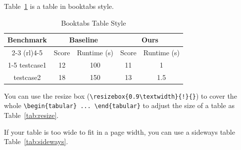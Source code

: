 Table~\ref{tab:booktabs-style} is a table in booktabs style.

\begin{table}[ht]
    \centering
    \caption{Booktabs Table Style}
    \begin{tabular}{@{}ccccc@{}}
    \toprule
    \multirow{2}{*}{Benchmark} & \multicolumn{2}{c}{Baseline} & \multicolumn{2}{c}{Ours} \\ \cmidrule(rl){2-3} \cmidrule(rl){4-5} 
                               & Score      & Runtime (s)     & Score    & Runtime (s)   \\ \cmidrule(){1-5}
    testcase1                  & 12         & 100             & 11       & 1             \\
    testcase2                  & 18         & 150             & 13       & 1.5           \\ \bottomrule
    \end{tabular}
    \label{tab:booktabs-style}
\end{table}

You can use the resize box (\verb|\resizebox{0.9\textwidth}{!}{}|) to cover the whole \verb|\begin{tabular} ... \end{tabular}| to adjust the size of a table as Table~\ref{tab:resize}.

\begin{table}[ht]
    \centering
    \caption{Table after Resizing}
    \label{tab:resize}
\end{table}

If your table is too wide to fit in a page width, you can use a sideways table Table~\ref{tab:sideways}.

